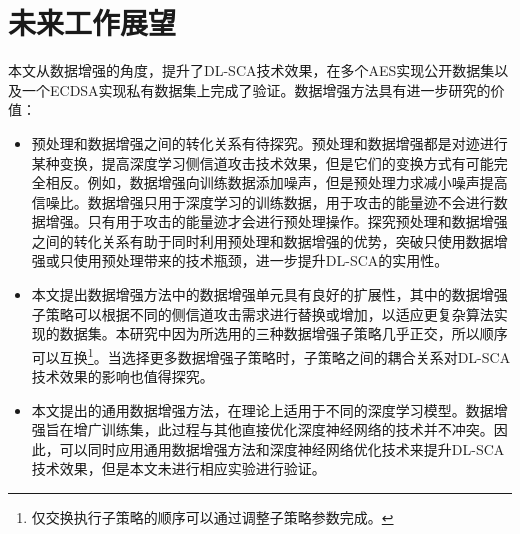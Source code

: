 {	\section{未来工作展望}
	本文从数据增强的角度，提升了DL-SCA技术效果，在多个AES实现公开数据集以及一个ECDSA实现私有数据集上完成了验证。数据增强方法具有进一步研究的价值：
	\begin{itemize}
		\item 预处理和数据增强之间的转化关系有待探究。预处理和数据增强都是对迹进行某种变换，提高深度学习侧信道攻击技术效果，但是它们的变换方式有可能完全相反。例如，数据增强向训练数据添加噪声，但是预处理力求减小噪声提高信噪比。数据增强只用于深度学习的训练数据，用于攻击的能量迹不会进行数据增强。只有用于攻击的能量迹才会进行预处理操作。探究预处理和数据增强之间的转化关系有助于同时利用预处理和数据增强的优势，突破只使用数据增强或只使用预处理带来的技术瓶颈，进一步提升DL-SCA的实用性。
		\item 本文提出数据增强方法中的数据增强单元具有良好的扩展性，其中的数据增强子策略可以根据不同的侧信道攻击需求进行替换或增加，以适应更复杂算法实现的数据集。本研究中因为所选用的三种数据增强子策略几乎正交，所以顺序可以互换\footnote{仅交换执行子策略的顺序可以通过调整子策略参数完成。}。当选择更多数据增强子策略时，子策略之间的耦合关系对DL-SCA技术效果的影响也值得探究。
		\item 本文提出的通用数据增强方法，在理论上适用于不同的深度学习模型。数据增强旨在增广训练集，此过程与其他直接优化深度神经网络的技术并不冲突。因此，可以同时应用通用数据增强方法和深度神经网络优化技术来提升DL-SCA技术效果，但是本文未进行相应实验进行验证。
	\end{itemize}
}